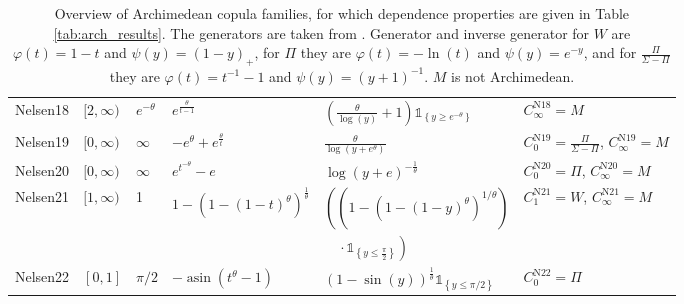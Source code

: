 \documentclass{article}
\def\1{\mathds{1}} %
\def\of#1{\left(#1\right)} %
\def\inbrackets#1{\of{#1}} %
\def\setof#1{\left\{#1\right\}} %
\begin{document}
\begin{table}[t!]
\begin{center}
{\begin{tabular}{llllll}
            Nelsen18 & $[2,\infty)$ & $e^{-\theta}$ &$e^{\frac{\theta}{t - 1}}$ &  $\inbrackets{\frac{\theta}{\log{\left(y \right)}} + 1}\1_{\setof{y\geq e^{-\theta}}}$ & $C^{\text{N18}}_{\infty} = M$ \\
            Nelsen19 & $[0,\infty)$ & $\infty$&    $- e^{\theta} + e^{\frac{\theta}{t}}$ & $\frac{\theta}{\log{\left(y + e^{\theta} \right)}}$ & $C^{\text{N19}}_{0} = \frac{\Pi}{\Sigma - \Pi}$, $C^{\text{N19}}_{\infty} = M$ \\
            Nelsen20 & $[0,\infty)$ & $\infty$&    $e^{t^{- \theta}} - e$ & $\log{\left(y + e \right)}^{- \frac{1}{\theta}}$ & $C^{\text{N20}}_{0} = \Pi$, $C^{\text{N20}}_{\infty} = M$ \\
            Nelsen21 & $[1,\infty)$ & 1 & $1 - \left(1 - \left(1 - t\right)^{\theta}\right)^{\frac{1}{\theta}}$ & $\left(\left(1 - (1 - \left(1 - y\right)^{\theta})^{1/\theta}\right)\right.$ & $C^{\text{N21}}_{1} = W$, $C^{\text{N21}}_{\infty} = M$ \\
            & & & & $\left.\quad\cdot\1_{\setof{y\leq \frac{\pi}{2}}}\right)$ & \\
            Nelsen22 & $[0,1]$ & $\pi/2$  &  $- \operatorname{asin}{\left(t^{\theta} - 1 \right)}$ &   $\left(1 - \sin{\left(y \right)}\right)^{\frac{1}{\theta}}\1_{\setof{y\leq \pi/2}}$ & $C^{\text{N22}}_{0} = \Pi$ \\
            \bottomrule
        \end{tabular}
        }
    \end{center}
    \caption{ 
        Overview of Archimedean copula families, for which dependence properties are given in Table \ref{tab:arch_results}.
        The generators are taken from \cite[Table 3.2]{Nelsen-2006}.
        Generator and inverse generator for $W$ are $\varphi(t)=1-t$ and $\psi(y)=(1-y)_+$, for $\Pi$ they are $\varphi(t)=-\ln(t)$ and $\psi(y)=e^{-y}$, and for $\frac{\Pi}{\Sigma - \Pi}$ they are $\varphi(t)=t^{-1} -1$ and $\psi(y)=(y+ 1)^{-1}$.
        $M$ is not Archimedean.
    }
    \label{tab:arch_overview}
\end{table}
\end{document}
